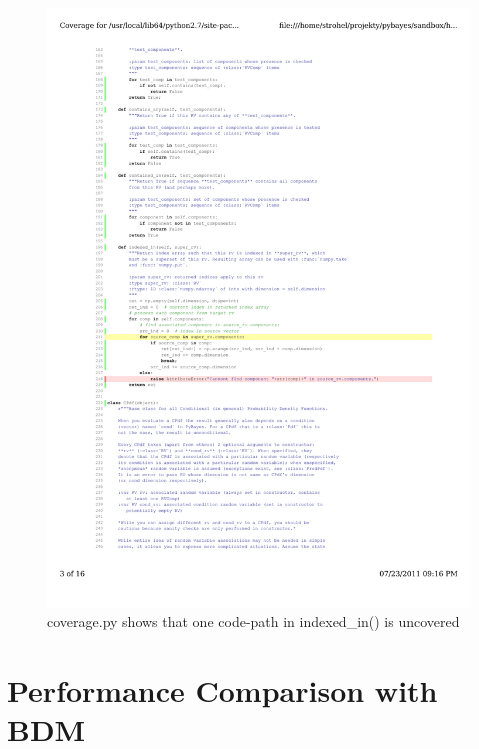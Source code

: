 \begin{figure}[ht]
	\centering
	\includegraphics[width=\textwidth,keepaspectratio=true,clip=true,trim=24mm 109mm 60mm 117mm]{./coverage.pdf}
	\vspace{-8mm}
	\caption{coverage.py shows that one code-path in indexed\_in() is uncovered}
	\label{fig:Coverage}
\end{figure}

\section{Performance Comparison with BDM} \label{sec:PyBayesPerformance}

